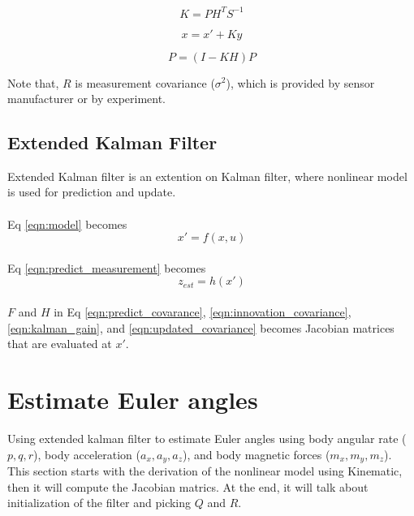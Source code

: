 \documentclass[]{article}
\begin{document}
\begin{equation}
K = PH^TS^{-1}\label{eqn:kalman_gain}
\end{equation}

\begin{equation}
x = x' + Ky\label{eqn:updated_states}
\end{equation}

\begin{equation}
P = (I-KH)P\label{eqn:updated_covariance}
\end{equation}

Note that, $R$ is measurement covariance ($\sigma^2$), which is provided by sensor manufacturer or by experiment.

\subsection{Extended Kalman Filter}
Extended Kalman filter is an extention on Kalman filter, where nonlinear model is used for prediction and update. 

\paragraph*{}
Eq \eqref{eqn:model} becomes
\begin{equation}
	x' = f(x, u) \label{eqn:model_nonlinear}
\end{equation}

\paragraph*{}
Eq \eqref{eqn:predict_measurement} becomes
\begin{equation}
	z_{est} = h(x') \label{eqn:predict_measurement_nonlinear}
\end{equation}

\paragraph*{}
$F$ and $H$ in Eq \eqref{eqn:predict_covarance}, \eqref{eqn:innovation_covariance}, \eqref{eqn:kalman_gain}, and \eqref{eqn:updated_covariance} becomes Jacobian matrices that are evaluated at $x'$.

\section{Estimate Euler angles}
Using extended kalman filter to estimate Euler angles using body angular rate ($p, q, r$), body acceleration ($a_x, a_y, a_z$), and body magnetic forces ($m_x, m_y, m_z$). This section  starts with the derivation of the nonlinear model using Kinematic, then it will compute the Jacobian matrics. At the end, it will talk about initialization of the filter and picking $Q$ and $R$.
\end{document}
